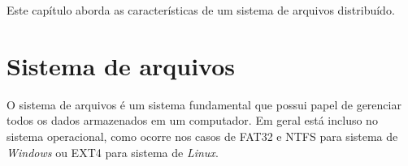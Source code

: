 	Este capítulo aborda as características de um sistema de arquivos distribuído. 
	

	\section{Sistema de arquivos}
	
	
	O sistema de arquivos é um sistema fundamental que possui papel de gerenciar todos os dados armazenados em um computador.
	Em geral está incluso no sistema operacional, como ocorre nos casos de FAT32 e NTFS para sistema de \textit{Windows} ou EXT4 para sistema de \textit{Linux}.
	
	
	
